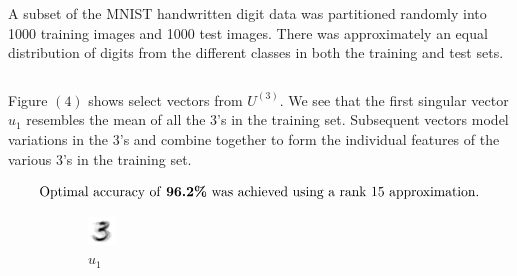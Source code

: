 \documentclass[a4paper]{article}
\begin{document}
A subset of the MNIST handwritten digit data \cite{mnist} was partitioned randomly into 1000 training images and 1000 test images.  There was approximately an equal distribution of digits from the different classes in both the training and test sets.

$$
$$

Figure $(4)$ shows select vectors from $U^{(3)}$.  We see that the first singular vector $u_1$ resembles the mean of all the 3's in the training set.  Subsequent vectors model variations in the 3's and combine together to form the individual features of the various 3's in the training set.

$$
\text{Optimal accuracy of \textbf{96.2\%} was achieved using a rank $15$ approximation.}
$$

\begin{figure}[H]
\centering
        \begin{subfigure}[b]{0.22\textwidth}
                \centering
                \includegraphics[width=\linewidth]{first3}
                \caption{$u_1$}
                \label{fig:first3}
        \end{subfigure}\hfill
        \begin{subfigure}[b]{0.22\textwidth}
                \centering

\end{subfigure}
\end{figure}
\end{document}
